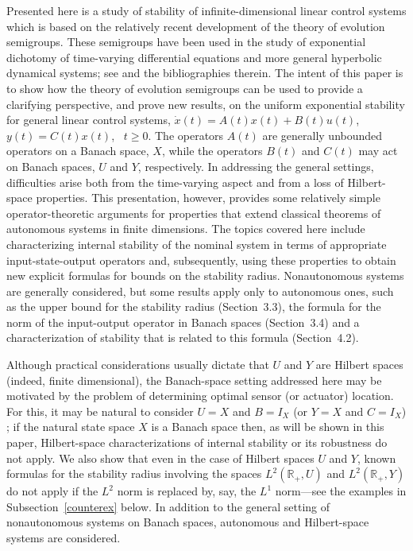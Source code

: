 \documentclass[10pt,psamsfonts,leqno]{siamltex}
\newcommand{\bbR}{\mathbb{R}}
\begin{document}
Presented here is a study of stability of infinite-dimensional linear
control systems which is based on the relatively recent development of
the theory of evolution semigroups.  These semigroups have been used in
the study of exponential dichotomy of time-varying differential
equations and more general hyperbolic dynamical systems; see
\cite{ChiLat,LMS2,LMSR,MiRaSc,vanNbook,RS1,RolandDis} and the
bibliographies therein. The intent of this paper is to show how the
theory of evolution  semigroups can be used
to  provide a clarifying perspective, and prove new results, on the
uniform
exponential stability  for  general linear control systems,
$\dot x(t)=A(t)x(t)+B(t)u(t)$, \ $y(t)=C(t)x(t)$, \ $t\ge0$.
The operators
$A(t)$ are generally unbounded operators on a Banach space,
$X$, while the operators $B(t)$ and $C(t)$ may act on Banach spaces,
$U$ and $Y$, respectively.  In addressing
the general settings, difficulties arise both from the time-varying
aspect and from a loss of Hilbert-space properties.
This presentation, however, provides some relatively simple
operator-theoretic arguments for properties that extend classical
theorems of autonomous systems in finite dimensions.
  The topics covered here include characterizing internal stability of
the nominal system in terms of  appropriate input-state-output operators
and, subsequently, using these properties to obtain  new explicit
formulas
for bounds on the stability radius.
Nonautonomous systems are generally considered, but some results apply
only to autonomous ones, such as the upper bound for the stability
radius (Section~3.3),  the formula for the norm of the input-output
operator in Banach spaces (Section~3.4) and a characterization of
stability that is related to this formula (Section~4.2).

Although practical considerations usually dictate that $U$ and $Y$ are
Hilbert spaces (indeed, finite dimensional), the Banach-space
setting addressed here may be motivated by the
problem of determining optimal sensor (or actuator) location.
For this, it may
be natural to consider $U=X$ and $B=I_X$ (or
$Y=X$ and $C=I_X$) \cite{burns};
if the natural state space $X$ is a
Banach space then, as will be shown in this paper, Hilbert-space
characterizations of internal stability  or
its robustness do not apply.  We also show that even in
the case of Hilbert spaces $U$ and $Y$, known formulas for the
stability radius
involving the spaces $L^2(\bbR_+,U)$ and $L^2(\bbR_+,Y)$ do
not apply if the $L^2$ norm is replaced by, say, the $L^1$ norm---see
the  examples in Subsection~\ref{counterex} below.
In addition to the general setting of
nonautonomous systems on Banach spaces, autonomous and Hilbert-space
systems are considered.
\end{document}
